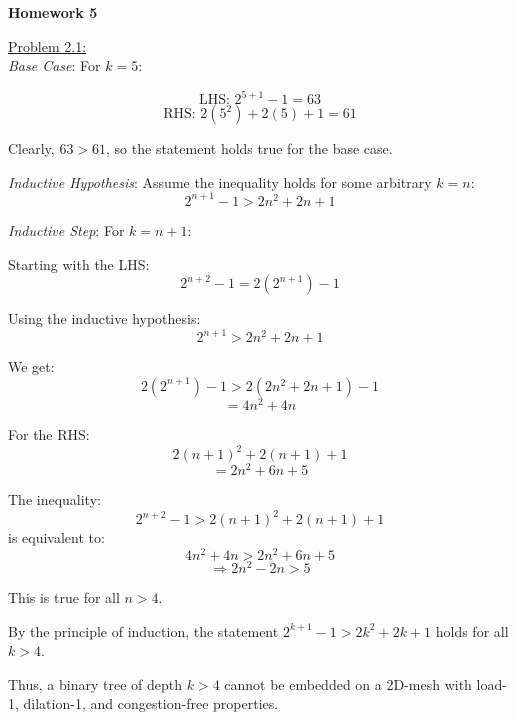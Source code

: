 \documentclass{article}
\begin{document}
\begin{center}
    \textbf{Homework 5}
\end{center}



\noindent \underline{ Problem 2.1:}\\
\noindent \textit{Base Case}:
For \( k = 5 \):

\[ \text{LHS: } 2^{5+1} - 1 = 63 \]
\[ \text{RHS: } 2(5^2) + 2(5) + 1 = 61 \]

Clearly, \( 63 > 61 \), so the statement holds true for the base case.

\noindent \textit{Inductive Hypothesis}:
Assume the inequality holds for some arbitrary \( k = n \):
\[ 2^{n+1} - 1 > 2n^2 + 2n + 1 \]

\noindent \textit{Inductive Step}:
For \( k = n + 1 \):

Starting with the LHS:
\[ 2^{n+2} - 1 = 2(2^{n+1}) - 1 \]

Using the inductive hypothesis:
\[ 2^{n+1} > 2n^2 + 2n + 1 \]

We get:
\[ 2(2^{n+1}) - 1 > 2(2n^2 + 2n + 1) - 1 \]
\[ = 4n^2 + 4n \]

For the RHS:
\[ 2(n+1)^2 + 2(n+1) + 1 \]
\[ = 2n^2 + 6n + 5 \]

The inequality:
\[ 2^{n+2} - 1 > 2(n+1)^2 + 2(n+1) + 1 \]
is equivalent to:
\[ 4n^2 + 4n > 2n^2 + 6n + 5 \]
\[ \Rightarrow 2n^2 - 2n > 5 \]

This is true for all \( n > 4 \).

By the principle of induction, the statement \( 2^{k+1} - 1 > 2k^2 + 2k + 1 \) holds for all \( k > 4 \).

Thus, a binary tree of depth \( k > 4 \) cannot be embedded on a 2D-mesh with load-1, dilation-1,
and congestion-free properties.\\~\\
\end{document}
